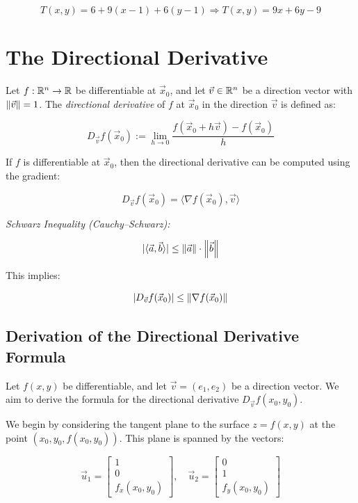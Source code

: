 \[
    T(x, y) = 6 + 9(x - 1) + 6(y - 1)
    \Rightarrow T(x, y) = 9x + 6y - 9
\]

\section{The Directional Derivative}

Let \( f : \mathbb{R}^n \to \mathbb{R} \) be differentiable at \( \vec{x}_0 \), 
and let \( \vec{v} \in \mathbb{R}^n \) be a direction vector with \( \left\| \vec{v} \right\| = 1 \). The 
\emph{directional derivative} of \(f\) at \( \vec{x}_0 \) in the direction \( \vec{v} \) is defined as:

\[
    D_{\vec{v}}f(\vec{x}_0) := \lim_{h \to 0} \frac{f(\vec{x}_0 + h\vec{v}) - f(\vec{x}_0)}{h}
\]

If \(f\) is differentiable at \( \vec{x}_0 \), then the directional derivative can be computed using the gradient:

\[
    D_{\vec{v}}f(\vec{x}_0) = \langle \nabla f(\vec{x}_0), \vec{v} \rangle
\]

\emph{Schwarz Inequality (Cauchy–Schwarz):}

\[
    |\langle \vec{a}, \vec{b} \rangle| \le \left\| \vec{a} \right\| \cdot \left\| \vec{b} \right\|
\]

This implies:

\[
    |D_{\vec{v}}f(\vec{x}_0)| \le \left\| \nabla f(\vec{x}_0) \right\|
\]

\subsection{Derivation of the Directional Derivative Formula}

Let \( f(x, y) \) be differentiable, and let \( \vec{v} = (e_1, e_2) \) be a direction vector. We aim to 
derive the formula for the directional derivative \( D_{\vec{v}} f(x_0, y_0) \).

We begin by considering the tangent plane to the surface \( z = f(x, y) \) at the point 
\( (x_0, y_0, f(x_0, y_0)) \). This plane is spanned by the vectors:

\[
    \vec{u}_1 = 
    \begin{bmatrix}
    1 \\
    0 \\
    f_x(x_0, y_0)
    \end{bmatrix}, \quad
    \vec{u}_2 = 
    \begin{bmatrix}
    0 \\
    1 \\
    f_y(x_0, y_0)
    \end{bmatrix}
\]

